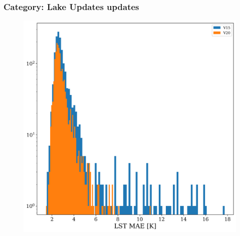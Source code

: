 \documentclass[hess, twostagejnl]{copernicus}
\providecommand{\DIFadd}[1]{{\protect\color{blue} \sf #1}} %
\providecommand{\DIFdel}[1]{{\protect\color{red} \scriptsize #1}} %
\providecommand{\DIFaddbegin}{} %
\providecommand{\DIFaddend}{} %
\providecommand{\DIFdelbegin}{} %
\providecommand{\DIFdelend}{} %
\providecommand{\DIFaddbeginFL}{} %
\providecommand{\DIFdelendFL}{} %
\begin{document}
\subsubsection{Category: Lake \DIFdelbegin \DIFdel{Updates}\DIFdelend \DIFaddbegin \DIFadd{updates}\DIFaddend }\DIFdelbegin %
\DIFdelendFL \DIFaddbeginFL \label{sec:lake1}
\begin{figure}
	\includegraphics[width=\columnwidth]{lakes_histogram_plot}

\end{figure}
\end{document}

